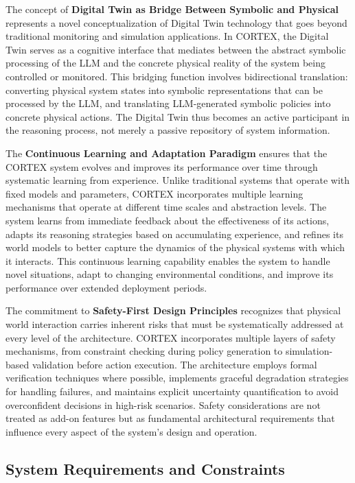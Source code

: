 The concept of \textbf{Digital Twin as Bridge Between Symbolic and Physical} represents a novel conceptualization of Digital Twin technology that goes beyond traditional monitoring and simulation applications. In CORTEX, the Digital Twin serves as a cognitive interface that mediates between the abstract symbolic processing of the LLM and the concrete physical reality of the system being controlled or monitored. This bridging function involves bidirectional translation: converting physical system states into symbolic representations that can be processed by the LLM, and translating LLM-generated symbolic policies into concrete physical actions. The Digital Twin thus becomes an active participant in the reasoning process, not merely a passive repository of system information.

The \textbf{Continuous Learning and Adaptation Paradigm} ensures that the CORTEX system evolves and improves its performance over time through systematic learning from experience. Unlike traditional systems that operate with fixed models and parameters, CORTEX incorporates multiple learning mechanisms that operate at different time scales and abstraction levels. The system learns from immediate feedback about the effectiveness of its actions, adapts its reasoning strategies based on accumulating experience, and refines its world models to better capture the dynamics of the physical systems with which it interacts. This continuous learning capability enables the system to handle novel situations, adapt to changing environmental conditions, and improve its performance over extended deployment periods.

The commitment to \textbf{Safety-First Design Principles} recognizes that physical world interaction carries inherent risks that must be systematically addressed at every level of the architecture. CORTEX incorporates multiple layers of safety mechanisms, from constraint checking during policy generation to simulation-based validation before action execution. The architecture employs formal verification techniques where possible, implements graceful degradation strategies for handling failures, and maintains explicit uncertainty quantification to avoid overconfident decisions in high-risk scenarios. Safety considerations are not treated as add-on features but as fundamental architectural requirements that influence every aspect of the system's design and operation.

\subsection{System Requirements and Constraints}


